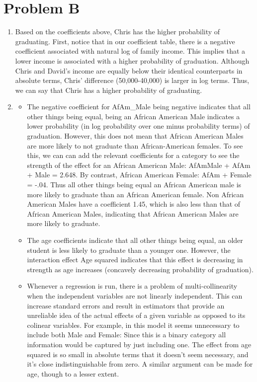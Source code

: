 \documentclass[a4paper]{article}
\begin{document}
\section{Problem B}
\begin{enumerate}
\item
Based on the coefficients above, Chris has the higher probability of graduating. First, notice that in our coefficient table, there is a negative coefficient associated with natural log of family income. This implies that a lower income is associated with a higher probability of graduation. Although Chris and David's income are equally below their identical counterparts in absolute terms, Chris' difference (50,000-40,000) is larger in log terms. Thus, we can say that Chris has a higher probability of graduating.
\item
\begin{itemize}
\item
The negative coefficient for AfAm\_Male being negative indicates that all other things being equal, being an African American Male indicates a lower probability (in log probability over one minus probability terms) of graduation. However, this does not mean that African American Males are more likely to not graduate than African-American females. To see this, we can can add the relevant coefficients for a category to see the strength of the effect for an African American Male: AfAmMale + AfAm + Male = 2.648. By contrast, African American Female: AfAm + Female = -.04. Thus all other things being equal an African American male is more likely to graduate than an African American female. Non African American Males have a coefficient 1.45, which is also less than that of African American Males, indicating that African American Males are more likely to graduate.
\item
The age coefficients indicate that all other things being equal, an older student is less likely to graduate than a younger one. However, the interaction effect Age squared indicates that this effect is decreasing in strength as age increases (concavely decreasing probability of graduation).
\item
Whenever a regression is run, there is a problem of multi-collinearity when the independent variables are not linearly independent. This can increase standard errors and result in estimators that provide an unreliable idea of the actual effects of a given variable as opposed to its colinear variables. For example, in this model it seems unnecessary to include both Male and Female: Since this is a binary category all information would be captured by just including one. The effect from age squared is so small in absolute terms that it doesn't seem necessary, and it's close indistinguishable from zero. A similar argument can be made for age, though to a lesser extent.
\end{itemize}
\end{enumerate}
\end{document}
